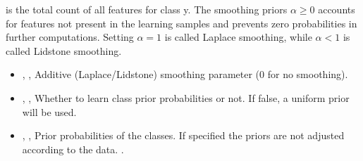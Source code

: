 is the total count of all features for class y.
%
The smoothing priors $\alpha \ge 0$ accounts for features not present in the
learning samples and prevents zero probabilities in further computations.
%
Setting $\alpha = 1$ is called Laplace smoothing, while $\alpha < 1$ is called
Lidstone smoothing.
%
\begin{itemize}
  \item {} , ,
  Additive (Laplace/Lidstone) smoothing parameter (0 for no smoothing).
  \item {} , ,
  Whether to learn class prior probabilities or not.
  If false, a uniform prior will be used.
  \item {} , ,
  Prior probabilities of the classes.
  If specified the priors are not adjusted according to the data.
  .
\end{itemize}

